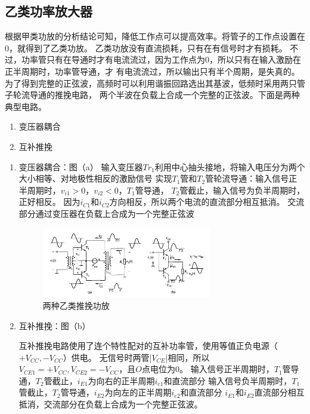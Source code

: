 \documentclass[10pt]{article}
\begin{document}
\subsection{乙类功率放大器}
根据甲类功放的分析结论可知，降低工作点可以提高效率。将管子的工作点设置在0，就得到了乙类功放。
乙类功放没有直流损耗，只有在有信号时才有损耗。
不过，功率管只有在导通时才有电流流过，因为工作点为0，所以只有在输入激励在正半周期时，功率管导通，才
有电流流过，所以输出只有半个周期，是失真的。
为了得到完整的正弦波，高频时可以利用谐振回路选出其基波，低频时采用两只管子轮流导通的推挽电路，
两个半波在负载上合成一个完整的正弦波。下面是两种典型电路。
    \begin{enumerate}
        \item 变压器耦合
        \item 互补推挽
    \end{enumerate}
\begin{example}
    \begin{enumerate}
    \item 变压器耦合：图（a）
    输入变压器$Tr_1$利用中心抽头接地，将输入电压分为两个大小相等、对地极性相反的激励信号
    实现$T_1$管和$T_2$管轮流导通：输入信号正半周期时，$v_{i1}>0$，$v_{i2}<0$，$T_1$管导通，
    $T_2$管截止，输入信号为负半周期时，正好相反。
    因为$i_{C1}$和$i_{C2}$方向相反，所以两个电流的直流部分相互抵消。
    交流部分通过变压器在负载上合成为一个完整正弦波\par
    \begin{figure}[H]
        \centering
        \includegraphics[width=0.7\textwidth]{pictures/2-7.png}
        \caption{两种乙类推挽功放}
    \end{figure}
    \item 互补推挽：图（b）\par
    互补推挽电路使用了连个特性配对的互补功率管，使用等值正负电源（$+V_{CC},-V_{CC}$）供电。
    无信号时两管|$V_{CE}$|相同，所以$V_{CE1} = +V_{CC}, V_{CE2} = -V_{CC}$，且$O$点电位为$0$。
    输入信号正半周期时，$T_1$管导通，$T_2$管截止，$i_{E1}$为向右的正半周期$i_{e1}$和直流部分
    输入信号负半周期时，$T_1$管截止，$T_2$管导通，$i_{E2}$为向左的正半周期$i_{e2}$和直流部分
    $i_{E1}$和$i_{E2}$直流部分相互抵消，交流部分在负载上合成为一个完整正弦波。
    \end{enumerate}
\end{example}
\end{document}
